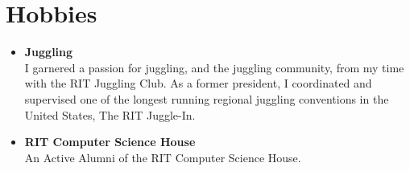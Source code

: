 \documentclass[10pt]{Article}
\begin{document}
\section*{Hobbies}
\begin{itemize}[topsep=1ex, itemsep=.5ex, parsep=0ex, partopsep=.7ex]
	\item[]{\bf Juggling}\\
	I garnered a passion for juggling, and the juggling community, from my time with the RIT Juggling Club. As a former president, I coordinated and supervised one of the longest running regional juggling conventions in the United States, The RIT Juggle-In.

	\item[]{\bf RIT Computer Science House}\\
	An Active Alumni of the RIT Computer Science House.
\end{itemize}
\end{document}
